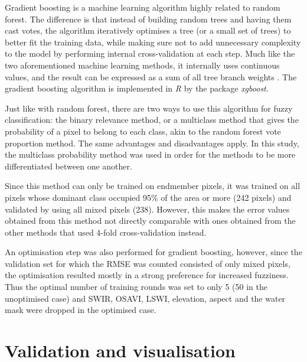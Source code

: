 \documentclass[a4paper,10pt]{book}
\begin{document}
Gradient boosting is a machine learning algorithm highly related to random forest. The difference is that instead of building random trees and having them cast votes, the algorithm iteratively optimises a tree (or a small set of trees) to better fit the training data, while making sure not to add unnecessary complexity to the model by performing internal cross-validation at each step. Much like the two aforementioned machine learning methods, it internally uses continuous values, and the result can be expressed as a sum of all tree branch weights \citep{friedman2001gradientboost}. The gradient boosting algorithm is implemented in \textit{R} by the package \textit{xgboost}.

Just like with random forest, there are two ways to use this algorithm for fuzzy classification: the binary relevance method, or a multiclass method that gives the probability of a pixel to belong to each class, akin to the random forest vote proportion method. The same advantages and disadvantages apply. In this study, the multiclass probability method was used in order for the methods to be more differentiated between one another.

Since this method can only be trained on endmember pixels, it was trained on all pixels whose dominant class occupied 95\% of the area or more (242 pixels) and validated by using all mixed pixels (238). However, this makes the error values obtained from this method not directly comparable with ones obtained from the other methods that used 4-fold cross-validation instead.

An optimisation step was also performed for gradient boosting, however, since the validation set for which the RMSE was counted consisted of only mixed pixels, the optimisation resulted mostly in a strong preference for increased fuzziness. Thus the optimal number of training rounds was set to only 5 (50 in the unoptimised case) and SWIR, OSAVI, LSWI, elevation, aspect and the water mask were dropped in the optimised case.

\section{Validation and visualisation}
\end{document}
